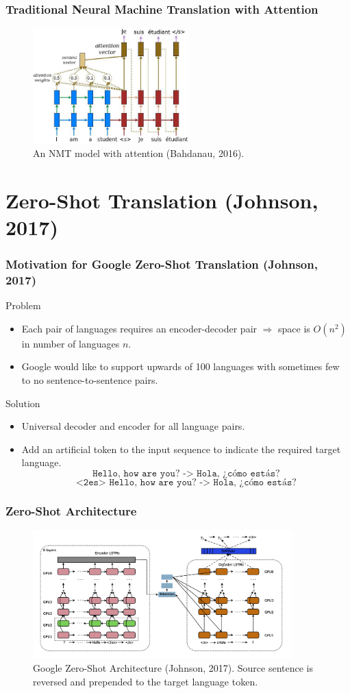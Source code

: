 \documentclass{beamer}
\begin{document}
\begin{frame}
\frametitle{Traditional Neural Machine Translation with Attention}
 \begin{figure}
  \centering
  \includegraphics[width=6cm]{pres_imgs/attention_mechanism}
  \caption{\label{fig:attention_mechanism} An NMT model with attention (Bahdanau, 2016). }
\end{figure}
\end{frame}

\section{Zero-Shot Translation (Johnson, 2017)}
\begin{frame}
\frametitle{Motivation for Google Zero-Shot Translation (Johnson, 2017)}
Problem
\begin{itemize}
\item Each pair of languages requires an encoder-decoder pair $\Rightarrow$ space is $O(n^2)$ in number of languages $n$.
\item Google would like to support upwards of 100 languages with sometimes few to no sentence-to-sentence pairs. \pause
\end{itemize}
Solution
\begin{itemize}
\item Universal decoder and encoder for all language pairs.
\item Add an artificial token to the input sequence to indicate the required target language.\pause
$$\texttt{Hello, how are you? -> Hola, ¿cómo estás?}$$
$$\texttt{<2es> Hello, how are you? -> Hola, ¿cómo estás?}$$
\end{itemize}
\end{frame}

\begin{frame}
\frametitle{Zero-Shot Architecture}
 \begin{figure}
  \centering
  \includegraphics[width=10cm]{pres_imgs/zero_shot_arch}
  \caption{\label{fig:zero_shot_arch} Google Zero-Shot Architecture (Johnson, 2017). Source sentence is reversed and prepended to the target language token.}
\end{figure}
\end{frame}
\end{document}
